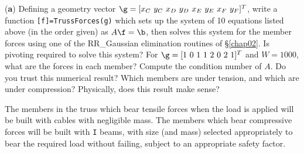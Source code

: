 \begin{exercise}
\noindent ({\bf a}) Defining a geometry vector
$\g=[x_C\ y_C\ x_D\ y_D\ x_E\ y_E\ x_F\ y_F]^T$,
write a function {\tt [f]=TrussForces(g)} which
sets up the system of 10 equations listed above (in the order given)
as $A\f = \b$, then solves this system for the member
forces using one of the RR_Gaussian elimination routines of \S \ref{chap02}.  Is pivoting required to solve this system?
For $\g=[1\ 0\ 1\ 1\ 2\ 0\ 2\ 1]^T$ and
$W=1000$, what are the forces in each member?  Compute the
condition number of $A$.  Do you trust this numerical result?  Which
members are under tension, and which are under compression?
Physically, does this result make sense?
\end{exercise}

The members in the truss which bear
tensile forces when the load is applied will be built with cables with
negligible mass.  The members which bear compressive forces will be built with {\tt I} beams, with size (and
mass) selected appropriately to bear the required load without failing,
subject to an appropriate safety factor. \vskip0.1in

\def\TE{TE}
\def\KE{KE}
\def\PE{PE}
\def\DE{DE}
\def\alphad{{\boldsymbol{\alpha}}}
\def\thetad{{\pmb{\theta}}}
\def\xid{{\boldsymbol{\xi}}}

